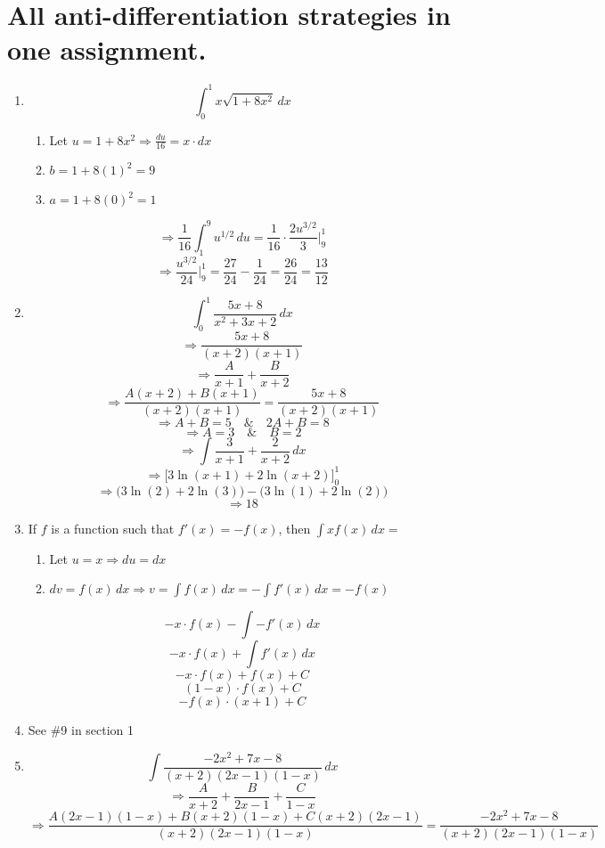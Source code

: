 \documentclass[12pt]{article}
\begin{document}
\section{All anti-differentiation strategies in one assignment.}
\begin{enumerate}
   
\item $$\int_{0}^{1} x \sqrt{1+8x^2} \, dx $$
\begin{enumerate}
    \item Let $u=1+8x^2 \Longrightarrow \frac{du}{16} = x \cdot dx $
    \item $b = 1 + 8(1)^2 = 9$
    \item $a = 1+8(0)^2=1$
\end{enumerate}

$$\Longrightarrow \frac{1}{16} \int_{1}^{9} u^{1/2} \, du = \frac{1}{16} \cdot \frac{2u^{3/2}}{3} \bigg\rvert^{1}_{9} $$
$$ \Longrightarrow \frac{u^{3/2}}{24} \bigg\rvert^{1}_{9} = \frac{27}{24}-\frac{1}{24} =\frac{26}{24} =\frac{13}{12}$$

\item  $$\int_{0}^{1} \frac{5x+8}{x^2+3x+2} \, dx$$
$$\Longrightarrow  \frac{5x+8}{(x+2)(x+1)}$$
$$\Longrightarrow \frac{A}{x+1} +\frac{B}{x+2}$$
$$\Longrightarrow \frac{A(x+2)+B(x+1)}{(x+2)(x+1)}=   \frac{5x+8}{(x+2)(x+1)}$$
$$\Longrightarrow A+B=5 \quad \& \quad 2A+B=8$$
$$\Longrightarrow A=3 \quad \& \quad B=2 $$
$$\Longrightarrow \int \frac{3}{x+1} +\frac{2}{x+2} \, dx$$
$$\Longrightarrow \bigg[3\ln(x+1)+2\ln(x+2)\bigg]^{1}_{0}$$
$$\Longrightarrow \bigg(3 \ln(2)+2\ln(3) \bigg) - \bigg(3 \ln(1)+2\ln(2) \bigg)$$
$$\Longrightarrow 18 $$



\item If $f$ is a function such that $f'(x)=-f(x)$, then $\int xf(x) \,dx =$
\begin{enumerate}
    \item Let $u=x \Longrightarrow du=dx$
    \item $dv=f(x) \,dx \Longrightarrow v=\int f(x) \, dx = -\int f'(x) \,dx = -f(x)$
\end{enumerate}
$$-x \cdot f(x)-\int -f'(x) \, dx$$
$$-x \cdot f(x)+\int f'(x) \, dx$$
$$-x \cdot f(x)+f(x) +C $$
$$(1-x)\cdot f(x) +C $$
$$-f(x)\cdot(x+1) +C $$
\item See \#9 in section 1

\item $$\int \frac{-2x^2+7x-8}{(x+2)(2x-1)(1-x)} \, dx$$
$$\Longrightarrow \frac{A}{x+2} + \frac{B}{2x-1} +\frac{C}{1-x}$$
$$\Longrightarrow \frac{A(2x-1)(1-x)+B(x+2)(1-x)+C(x+2)(2x-1)}{(x+2)(2x-1)(1-x)} = \frac{-2x^2+7x-8}{(x+2)(2x-1)(1-x)}$$


\end{enumerate}
\end{document}
